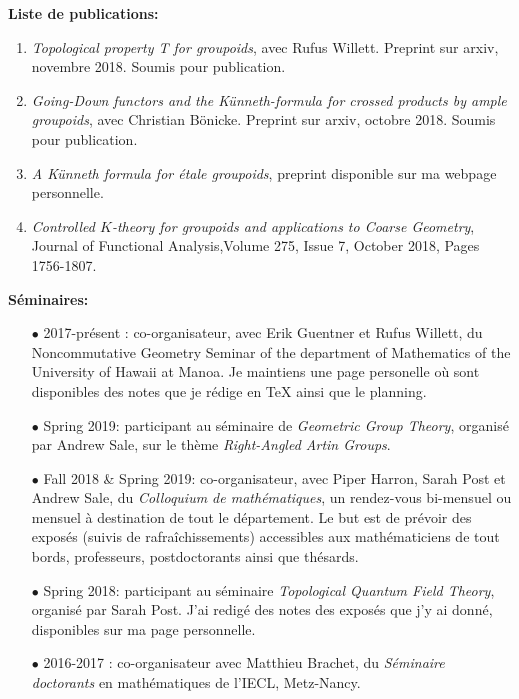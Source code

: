\documentclass[a4paper,11pt]{article}
\newcommand\espace{\vrule height 20pt width 0pt}
\begin{document}
\textbf{Liste de publications:} 
\begin{enumerate}
\item \textit{Topological property T for groupoids}, avec Rufus Willett. Preprint sur arxiv, novembre 2018. Soumis pour publication.
\item \textit{Going-Down functors and the Künneth-formula for crossed products by ample groupoids}, avec Christian Bönicke. Preprint sur arxiv, octobre 2018. Soumis pour publication.
\item \textit{A K\"{u}nneth formula for \'etale groupoids}, preprint disponible sur ma webpage personnelle.
\item \textit{Controlled $K$-theory for groupoids and applications to Coarse Geometry}, Journal of Functional Analysis,Volume 275, Issue 7, October 2018, Pages 1756-1807. 
\end{enumerate}

\espace

\textbf{S\'eminaires:} \\

\begin{itemize}
\item[$\bullet$] 2017-pr\'esent : co-organisateur, avec Erik Guentner et Rufus Willett, du Noncommutative Geometry Seminar of the department of Mathematics of the University of Hawaii at Manoa. Je maintiens une page personelle o\`u sont disponibles des notes que je r\'edige en TeX ainsi que le planning.\\

\item[$\bullet$] Spring 2019: participant au s\'eminaire de \textit{Geometric Group Theory}, organis\'e par Andrew Sale, sur le th\`eme \textit{Right-Angled Artin Groups}.  \\
\item[$\bullet$] Fall 2018 \& Spring 2019: co-organisateur, avec Piper Harron, Sarah Post et Andrew Sale, du \textit{Colloquium de math\'ematiques}, un rendez-vous bi-mensuel ou mensuel \`a destination de tout le d\'epartement. Le but est de pr\'evoir des expos\'es (suivis de rafra\^{i}chissements) accessibles aux math\'ematiciens de tout bords, professeurs, postdoctorants ainsi que th\'esards.\\
\item[$\bullet$] Spring 2018: participant au s\'eminaire \textit{Topological Quantum Field Theory}, organis\'e par Sarah Post. J'ai redig\'e des notes des expos\'es que j'y ai donn\'e, disponibles sur ma page personnelle. \\
\item[$\bullet$] 2016-2017 : co-organisateur avec Matthieu Brachet, du \textit{S\'eminaire doctorants} en math\'ematiques de l'IECL, Metz-Nancy.
\end{itemize}
\end{document}
